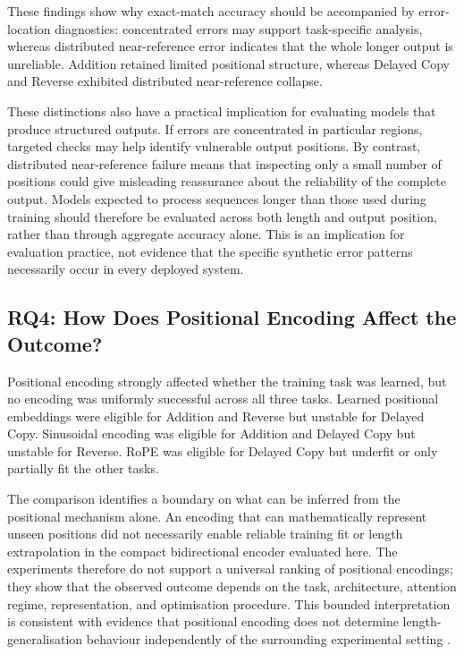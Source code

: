 \documentclass[
    author={Aanchala Ravindra Bhongade},
    supervisor={Dr. Fernando Moreno-Pino},
    degree={MSc},
    title={Length Generalisation in Transformer-Based Sequence Models: Failure Taxonomy and Mitigation Strategies},
    subtitle={},
    type={},
    year={2026}
]{dissertation}
\begin{document}
These findings show why exact-match accuracy should be accompanied by error-location diagnostics: concentrated errors may support task-specific analysis, whereas distributed near-reference error indicates that the whole longer output is unreliable. Addition retained limited positional structure, whereas Delayed Copy and Reverse exhibited distributed near-reference collapse.

These distinctions also have a practical implication for evaluating models that produce structured outputs. If errors are concentrated in particular regions, targeted checks may help identify vulnerable output positions. By contrast, distributed near-reference failure means that inspecting only a small number of positions could give misleading reassurance about the reliability of the complete output. Models expected to process sequences longer than those used during training should therefore be evaluated across both length and output position, rather than through aggregate accuracy alone. This is an implication for evaluation practice, not evidence that the specific synthetic error patterns necessarily occur in every deployed system.

\subsection{RQ4: How Does Positional Encoding Affect the Outcome?}

Positional encoding strongly affected whether the training task was learned, but no encoding was uniformly successful across all three tasks. Learned positional embeddings were eligible for Addition and Reverse but unstable for Delayed Copy. Sinusoidal encoding was eligible for Addition and Delayed Copy but unstable for Reverse. RoPE was eligible for Delayed Copy but underfit or only partially fit the other tasks.

The comparison identifies a boundary on what can be inferred from the positional mechanism alone. An encoding that can mathematically represent unseen positions did not necessarily enable reliable training fit or length extrapolation in the compact bidirectional encoder evaluated here. The experiments therefore do not support a universal ranking of positional encodings; they show that the observed outcome depends on the task, architecture, attention regime, representation, and optimisation procedure. This bounded interpretation is consistent with evidence that positional encoding does not determine length-generalisation behaviour independently of the surrounding experimental setting \cite{kazemnejad2023impact}.
\end{document}
